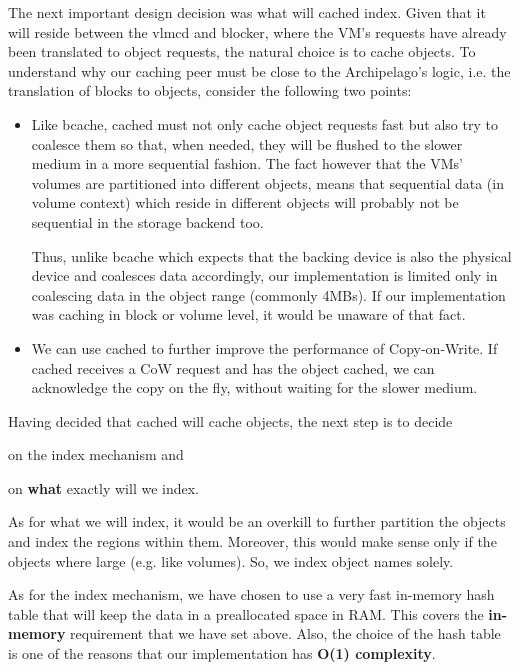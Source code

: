 The next important design decision was what will cached index. Given that it 
will reside between the vlmcd and blocker, where the VM's requests have already 
been translated to object requests, the natural choice is to cache objects. To 
understand why our caching peer must be close to the Archipelago's logic, i.e.  
the translation of blocks to objects, consider the following two points:

\begin{itemize}
\item Like bcache, cached must not only cache object requests fast but also try 
	to coalesce them so that, when needed, they will be flushed to the 
	slower medium in a more sequential fashion. The fact however that the 
	VMs' volumes are partitioned into different objects, means that 
	sequential data (in volume context) which reside in different objects 
	will probably not be sequential in the storage backend too.
	
	Thus, unlike bcache which expects that the backing device is also the 
	physical device and coalesces data accordingly, our implementation is 
	limited only in coalescing data in the object range (commonly 4MBs). If 
	our implementation was caching in block or volume level, it would be 
	unaware of that fact.
\item We can use cached to further improve the performance of Copy-on-Write.  
	If cached receives a CoW request and has the object cached, we can
	acknowledge the copy on the fly, without waiting for the slower medium.
\end{itemize}

Having decided that cached will cache objects, the next step is to decide
\begin{inparaenum}[i)]
\item on the index mechanism and
\item on \textbf{what} exactly will we index.
\end{inparaenum}

As for what we will index, it would be an overkill to further partition the 
objects and index the regions within them. Moreover, this would make sense only 
if the objects where large (e.g. like volumes). So, we index object names 
solely.

As for the index mechanism, we have chosen to use a very fast in-memory hash 
table that will keep the data in a preallocated space in RAM. This covers the 
\textbf{in-memory} requirement that we have set above. Also, the choice of the 
hash table is one of the reasons that our implementation has \textbf{O(1) 
	complexity}.

